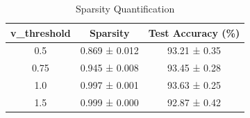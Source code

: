 \begin{table}[!t]
\centering
\caption{Sparsity Quantification}
\label{tab:sparsity}
\begin{tabular}{c c c}
\toprule
v\_threshold & Sparsity & Test Accuracy (\%) \\
\midrule
0.5 & 0.869 ± 0.012 & 93.21 ± 0.35 \\
0.75 & 0.945 ± 0.008 & 93.45 ± 0.28 \\
1.0 & 0.997 ± 0.001 & 93.63 ± 0.25 \\
1.5 & 0.999 ± 0.000 & 92.87 ± 0.42 \\
\bottomrule
\end{tabular}
\end{table}